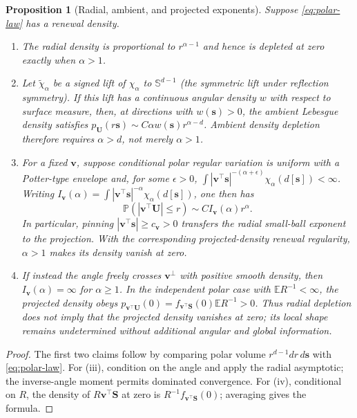 \documentclass[10pt]{article}
\newtheorem{proposition}[theorem]{Proposition}
\theoremstyle{definition}
\theoremstyle{remark}
\newcommand{\E}{\mathbb E}
\newcommand{\Pp}{\mathbb P}
\newcommand{\vvec}{\mathbf v}
\newcommand{\svec}{\mathbf s}
\begin{document}
\begin{proposition}[Radial, ambient, and projected exponents]
\label{prop:geometry}
Suppose \eqref{eq:polar-law} has a renewal density.
\begin{enumerate}[label=(\roman*)]
\item The radial density is proportional to $r^{\alpha-1}$ and hence is
depleted at zero exactly when $\alpha>1$.
\item Let $\widetilde\chi_\alpha$ be a signed lift of $\chi_\alpha$ to
$\mathbb S^{d-1}$ (the symmetric lift under reflection symmetry).  If this
lift has a continuous angular density $w$ with respect to surface measure,
then, at directions with $w(\svec)>0$, the ambient Lebesgue density satisfies
$p_{\mathbf U}(r\svec)\sim C\alpha w(\svec)r^{\alpha-d}$.  Ambient density
depletion therefore requires $\alpha>d$, not merely $\alpha>1$.
\item For a fixed $\vvec$, suppose conditional polar regular variation is
uniform with a Potter-type envelope and, for some $\epsilon>0$,
$\int|\vvec^\top\svec|^{-(\alpha+\epsilon)}
\chi_\alpha(d[\svec])<\infty$.  Writing
$I_\vvec(\alpha)=\int|\vvec^\top\svec|^{-\alpha}
\chi_\alpha(d[\svec])$, one then has
\begin{equation}
 \Pp(|\vvec^\top\mathbf U|\le r)
 \sim C I_\vvec(\alpha)r^\alpha.
 \label{eq:projection-law}
\end{equation}
In particular, pinning $|\vvec^\top\svec|\ge c_\vvec>0$ transfers the radial
small-ball exponent to the projection.  With the corresponding
projected-density renewal regularity, $\alpha>1$ makes its density vanish at
zero.
\item If instead the angle freely crosses $\vvec^\perp$ with positive smooth
density, then $I_\vvec(\alpha)=\infty$ for $\alpha\ge1$.  In the independent
polar case with $\E R^{-1}<\infty$, the projected density obeys
$p_{\vvec^\top\mathbf U}(0)=f_{\vvec^\top\mathbf S}(0)\E R^{-1}>0$.
Thus radial depletion does not imply that the projected density vanishes at
zero; its local shape remains undetermined without additional angular and
global information.
\end{enumerate}
\end{proposition}

\begin{proof}
The first two claims follow by comparing polar volume
$r^{d-1}dr\,d\svec$ with \eqref{eq:polar-law}.  For (iii), condition on the
angle and apply the radial asymptotic; the inverse-angle moment permits
dominated convergence.  For (iv), conditional on $R$, the density of
$R\vvec^\top\mathbf S$ at zero is
$R^{-1}f_{\vvec^\top\mathbf S}(0)$; averaging gives the formula.
\end{proof}
\end{document}
